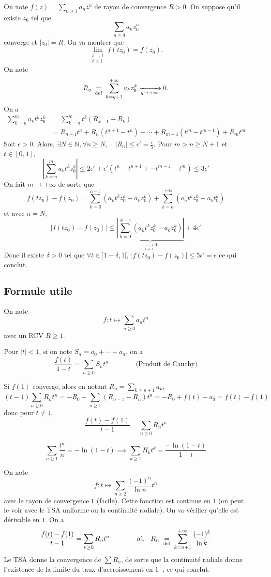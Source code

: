On note $f(z)=\sum_{n\geq 1}a_nz^n$ de rayon de convergence $R>0$. On suppose qu'il existe $z_0$ tel que \[
    \sum_{n\geq 0}a_nz_0^n
\]
converge et $|z_0|=R$. On va montrer que \[
    \lim_{\substack{t\to1\\t<1}}f(tz_0)=f(z_0).
\]
On note \[
    R_q\;\underset{\text{def}}=\; \sum_{k=q+1}^{+\infty}a_kz_0^k\xrightarrow[q\to+\infty]{}0.
\]
On a \begin{align*}
    \sum_{k=n}^ma_kt^kz_0^k&=\sum_{k=n}^mt^k(R_{k-1}-R_k)\\&=R_{n-1}t^n+R_n(t^{n+1}-t^n)+\cdots +R_{m-1}(t^m-t^{m-1})+R_mt^m
\end{align*}
Soit $\epsilon>0$. Alors, $\exists N\in\mathbb N, \forall n\geq N, \quad |R_n|\leq \epsilon'=\frac\epsilon5$.
Pour $m>n\geq N+1$ et $t\in[0, 1]$, \[
    \left| \sum_{k=n}^ma_kt^kz_0^k \right|\leq 2\epsilon' + \epsilon'(t^n-t^{n+1}+\cdots t^{m-1}-t^m)\leq 3\epsilon'
\]
On fait $m\longrightarrow +\infty$ de sorte que \[
    f(tz_0)-f(z_0)=\sum_{k=0}^{n-1}(a_kt^kz_0^k-a_kz_0^k)+\sum_{k=n}^{+\infty}(a_nt^kz_0^k-a_kt_0^k)
\]
et avec $n=N$, \[
    \left| f(tz_0)-f(z_0) \right|\leq \underbrace{\left| \sum_{k=0}^{N-1}(a_kt^kz_0^k-a_kz_0^k) \right|}_{\displaystyle \xrightarrow[t\to 1]{}0}+4\epsilon'
\]
Donc il existe $\delta>0$ tel que $\forall t\in ]1-\delta, 1[$, $|f(tz_0)-f(z_0)|\leq 5\epsilon'=\epsilon$ ce qui conclut.

\subsection{Formule utile}

On note \[
    f:t\longmapsto \sum_{n\geq 0}a_nt^n
\]
avec un RCV $R\geq 1$.

Pour $|t|<1$, si on note $S_n=a_0+\cdots +a_n$, on a \[
    \frac{f(t)}{1-t}=\sum_{n\geq 0}S_nt^n\qquad \qquad \text{(Produit de Cauchy)}
\]

Si $f(1)$ converge, alors en notant $R_n=\sum_{k\geq n+1}a_k$, \[
    (t-1)\sum_{n\geq 0}R_nt^n=-R_0+\sum_{n\geq 1}(R_{n-1}-R_n)t^n=-R_0+f(t)-a_0=f(t)-f(1)
\]
donc pour $t\neq 1$, \[
    \frac{f(t)-f(1)}{t-1}=\sum_{n\geq 0}R_nt^n
\]

\begin{ex}
    \[
        \sum_{n\geq 1}\frac{t^n}n=-\ln(1-t)\implies \sum_{k\geq 1}H_kt^k=\frac{-\ln(1-t)}{1-t}
    \]
\end{ex}

\begin{ex}
    On note \[
        f:t\longmapsto \sum_{n\geq 2}\frac{(-1)^n}{\ln n}t^n
    \]
    avec le rayon de convergence $1$ (facile). Cette fonction est continue en $1$ (on peut le voir avec le TSA uniforme ou la continuité radiale). On va vérifier qu'elle est dérivable en $1$. On a \[
        \frac{f(t)-f(1)}{t-1}=\sum_{n\geq 0}R_nt^n\qquad \qquad \text{où}\quad R_n\;\underset{\text{def}}=\;\sum_{k=n+1}^{+\infty}\frac{(-1)^k}{\ln k}
    \]
    Le TSA donne la convergence de $\sum R_n$, de sorte que la continuité radiale donne l'existence de la limite du taux d'accroissement en $1^-$, ce qui conclut.
\end{ex}

